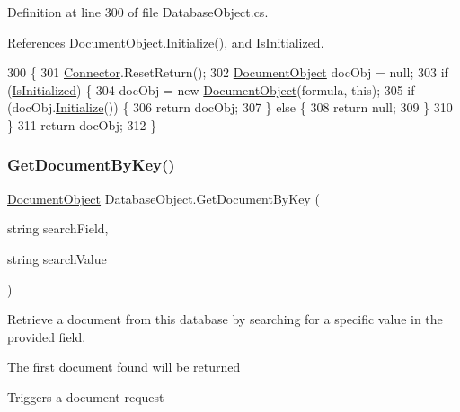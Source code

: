 Definition at line 300 of file Database\+Object.\+cs.



References Document\+Object.\+Initialize(), and Is\+Initialized.


\begin{DoxyCode}
300                                                                \{
301         \mbox{\hyperlink{class_connector}{Connector}}.ResetReturn();
302         \mbox{\hyperlink{class_document_object}{DocumentObject}} docObj = null;
303         \textcolor{keywordflow}{if} (\mbox{\hyperlink{class_database_object_a5fe036d32a30eb10d1b3f6a30263f740}{IsInitialized}}) \{
304             docObj = \textcolor{keyword}{new} \mbox{\hyperlink{class_document_object}{DocumentObject}}(formula, \textcolor{keyword}{this});
305             \textcolor{keywordflow}{if} (docObj.\mbox{\hyperlink{class_document_object_af4298d6cfbb9ea60643d9995309b73f1}{Initialize}}()) \{
306                 \textcolor{keywordflow}{return} docObj;
307             \} \textcolor{keywordflow}{else} \{
308                 \textcolor{keywordflow}{return} null;
309             \}
310         \}
311         \textcolor{keywordflow}{return} docObj;
312     \}
\end{DoxyCode}
\mbox{\label{class_database_object_a57bfc77d2754236cbcf6ac30a90da529}} 
\subsubsection{\texorpdfstring{Get\+Document\+By\+Key()}{GetDocumentByKey()}}
{\footnotesize\ttfamily \mbox{\hyperlink{class_document_object}{Document\+Object}} Database\+Object.\+Get\+Document\+By\+Key (\begin{DoxyParamCaption}\item[{string}]{search\+Field,  }\item[{string}]{search\+Value }\end{DoxyParamCaption})}



Retrieve a document from this database by searching for a specific value in the provided field. 

The first document found will be returned

Triggers a document request

